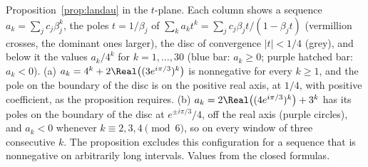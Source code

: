\caption{Proposition~\ref{prop:landau} in the $t$-plane. Each column shows
a sequence $a_k=\sum_jc_j\beta_j^k$, the poles $t=1/\beta_j$ of
$\sum_ka_kt^k=\sum_jc_j\beta_jt/(1-\beta_jt)$ (vermillion crosses, the
dominant ones larger), the disc of convergence $\lvert t\rvert<1/4$
(grey), and below it the values $a_k/4^k$ for $k=1,\dots,30$ (blue bar:
$a_k\ge0$; purple hatched bar: $a_k<0$). (a) $a_k=4^k+2\Real
\bigl((3e^{i\pi/3})^k\bigr)$ is nonnegative for every $k\ge1$, and the
pole on the boundary of the disc is on the positive real axis, at $1/4$,
with positive coefficient, as the proposition requires. (b)
$a_k=2\Real\bigl((4e^{i\pi/3})^k\bigr)+3^k$ has its poles on the boundary
of the disc at $e^{\pm i\pi/3}/4$, off the real axis (purple circles), and
$a_k<0$ whenever $k\equiv2,3,4\pmod6$, so on every window of three
consecutive $k$. The proposition excludes this configuration for a
sequence that is nonnegative on arbitrarily long intervals. Values from
the closed formulas.}
\label{fig:landau-poles}
